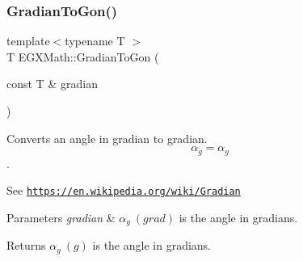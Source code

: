 \subsubsection{\texorpdfstring{Gradian\+To\+Gon()}{GradianToGon()}}
{\footnotesize\ttfamily template$<$typename T $>$ \\
T E\+G\+X\+Math\+::\+Gradian\+To\+Gon (\begin{DoxyParamCaption}\item[{const T \&}]{gradian }\end{DoxyParamCaption})}



Converts an angle in gradian to gradian. \[\alpha_{g}=\alpha_{g}\]. 

See \href{https://en.wikipedia.org/wiki/Gradian}{\tt https\+://en.\+wikipedia.\+org/wiki/\+Gradian} 
\begin{DoxyParams}{Parameters}
{\em gradian} & $\alpha_{g}\ (grad)$ is the angle in gradians. \\
\hline
\end{DoxyParams}
\begin{DoxyReturn}{Returns}
$\alpha_{g}\ (g)$ is the angle in gradians. 
\end{DoxyReturn}

